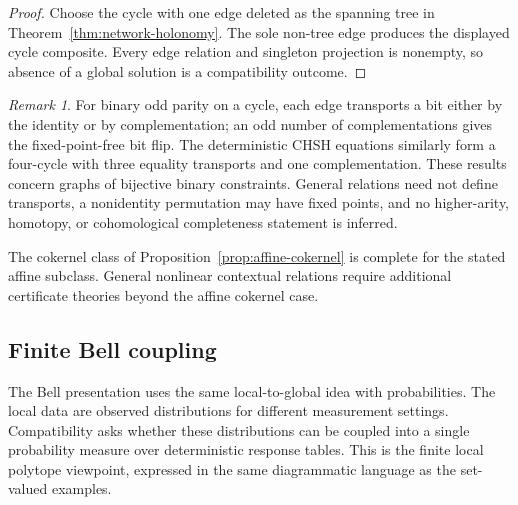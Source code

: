 \documentclass[11pt]{article}
\theoremstyle{plain}
\theoremstyle{definition}
\theoremstyle{remark}
\newtheorem{remark}[theorem]{Remark}
\begin{document}
\begin{proof}
Choose the cycle with one edge deleted as the spanning tree in
Theorem~\ref{thm:network-holonomy}. The sole non-tree edge produces the displayed
cycle composite. Every edge relation and singleton projection is nonempty, so
absence of a global solution is a compatibility outcome.
\end{proof}

\begin{remark}
For binary odd parity on a cycle, each edge transports a bit either by the
identity or by complementation; an odd number of complementations gives the
fixed-point-free bit flip. The deterministic CHSH equations similarly form a
four-cycle with three equality transports and one complementation. These results
concern graphs of bijective binary constraints. General relations need not
define transports, a nonidentity permutation may have fixed points, and no
higher-arity, homotopy, or cohomological completeness statement is inferred.
\end{remark}

The cokernel class of Proposition~\ref{prop:affine-cokernel} is complete for the
stated affine subclass. General nonlinear contextual relations require
additional certificate theories beyond the affine cokernel case.

\subsection{Finite Bell coupling}

The Bell presentation uses the same local-to-global idea with probabilities.
The local data are observed distributions for different measurement settings.
Compatibility asks whether these distributions can be coupled into a single
probability measure over deterministic response tables. This is the finite local
polytope viewpoint, expressed in the same diagrammatic language as the set-valued
examples.
\end{document}
